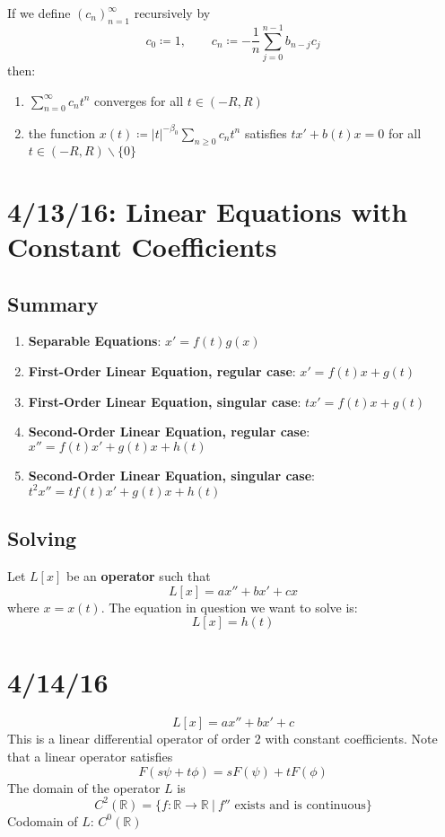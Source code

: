 \documentclass[12pt]{article}
\begin{document}
\begin{theorem}
If we define $(c_n)_{n=1}^{\infty}$ recursively by \[ c_0 \coloneqq 1, \qquad c_n \coloneqq -\frac{1}{n}\sum_{j=0}^{n-1}b_{n-j}c_j \]
then: \begin{enumerate}
\item $\displaystyle\sum_{n=0}^{\infty} c_nt^n$ converges for all $t \in (-R,R)$ \\
\item the function $x(t) \coloneqq|t|^{-\beta_0}\displaystyle\sum_{n \ge 0} c_nt^n$ satisfies $tx' + b(t)x = 0$ for all $t \in (-R,R)\backslash \{0\}$
\end{enumerate}
\end{theorem}

\section{4/13/16: Linear Equations with Constant Coefficients}
\subsection{Summary}
\begin{enumerate}
\item \textbf{Separable Equations}: $x' = f(t)g(x)$ 
\item \textbf{First-Order Linear Equation, regular case}: $x' = f(t)x + g(t)$
\item \textbf{First-Order Linear Equation, singular case}: $tx' = f(t)x + g(t)$
\item \textbf{Second-Order Linear Equation, regular case}: $x'' = f(t)x' + g(t)x + h(t)$
\item \textbf{Second-Order Linear Equation, singular case}: $t^2x'' = tf(t)x' + g(t)x + h(t)$
\end{enumerate}

\subsection{Solving}
Let $L[x]$ be an \textbf{operator} such that
\[ L[x] = ax'' + bx' + cx \]
where $x=x(t)$. The equation in question we want to solve is:
\[ L[x] = h(t) \]

\section{4/14/16}
\[ L[x] = ax'' + bx' + c \]
This is a linear differential operator of order 2 with constant coefficients. Note that a linear operator satisfies \[ F(s\psi + t\phi) = sF(\psi) + tF(\phi) \]
The domain of the operator $L$ is \[ C^2(\mathbb{R}) = \{ f: \mathbb{R} \to \mathbb{R} \ | \ f'' \text{ exists and is continuous} \} \]
Codomain of $L$: $C^0(\mathbb{R})$
\end{document}
